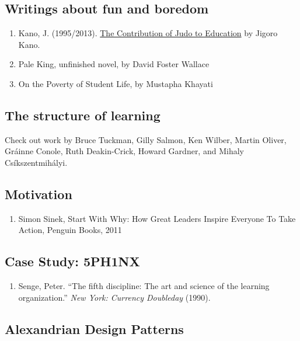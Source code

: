 \subsection{Writings about fun and boredom}

\begin{enumerate}
\item
  Kano, J. (1995/2013).   \href{http://judoinfo.com/kano.htm}{The Contribution of Judo to Education} by Jigoro Kano.
\item
  Pale King, unfinished novel, by David Foster Wallace
\item
  On the Poverty of Student Life, by Mustapha Khayati
\end{enumerate}

\subsection{The structure of learning}

Check out work by Bruce Tuckman, Gilly Salmon, Ken Wilber, Martin
Oliver, Gráinne Conole, Ruth Deakin-Crick, Howard Gardner, and Mihaly
Csíkszentmihályi.

\subsection{Motivation}

\begin{enumerate}
\item
  Simon Sinek, Start With Why: How Great Leaders Inspire Everyone To
  Take Action, Penguin Books, 2011
\end{enumerate}
\subsection{Case Study: 5PH1NX}

\begin{enumerate}
\item
  Senge, Peter. ``The fifth discipline: The art and science of the
  learning organization.'' \emph{New York: Currency Doubleday} (1990).
\end{enumerate}
\subsection{Alexandrian Design Patterns}

